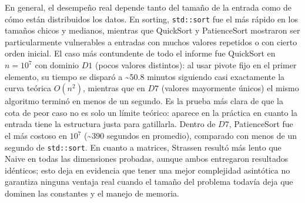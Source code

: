 En general, el desempeño real depende tanto del tamaño de la entrada como de
cómo están distribuidos los datos. En sorting, \texttt{std::sort} fue el más
rápido en los tamaños chicos y medianos, mientras que QuickSort y
PatienceSort mostraron ser particularmente vulnerables a entradas con muchos
valores repetidos o con cierto orden inicial. El caso más contundente de todo
el informe fue QuickSort en $n=10^7$ con dominio $D1$ (pocos valores
distintos): al usar pivote fijo en el primer elemento, su tiempo se disparó a
\textasciitilde50.8 minutos siguiendo casi exactamente la curva teórica
$O(n^2)$, mientras que en $D7$ (valores mayormente únicos) el mismo algoritmo
terminó en menos de un segundo. Es la prueba más clara de que la cota de peor
caso no es solo un límite teórico: aparece en la práctica en cuanto la
entrada tiene la estructura justa para gatillarla. Dentro de $D7$,
PatienceSort fue el más costoso en $10^7$ (\textasciitilde390 segundos en
promedio), comparado con menos de un segundo de \texttt{std::sort}. En
cuanto a matrices, Strassen resultó más lento que Naive en todas las
dimensiones probadas, aunque ambos entregaron resultados idénticos; esto
deja en evidencia que tener una mejor complejidad asintótica no garantiza
ninguna ventaja real cuando el tamaño del problema todavía deja que dominen
las constantes y el manejo de memoria.
